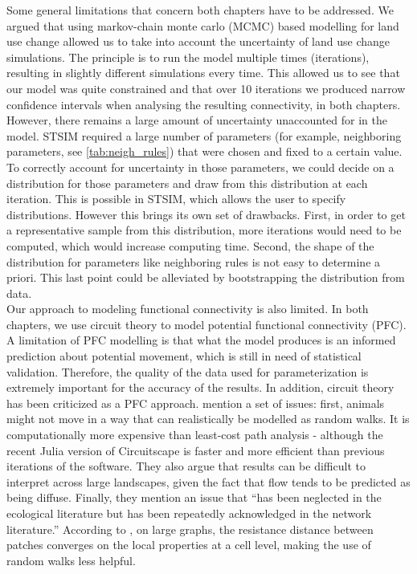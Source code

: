 \documentclass[12pt,Bold,TexShade]{thesis/mcgilletdclass}
\begin{document}
{Some general limitations that concern both chapters have to be addressed. We argued that using markov-chain monte carlo (MCMC) based modelling for land use change allowed us to take into account the uncertainty of land use change simulations. The principle is to run the model multiple times (iterations), resulting in slightly different simulations every time. This allowed us to see that our model was quite constrained and that over 10 iterations we produced narrow confidence intervals when analysing the resulting connectivity, in both chapters. However, there remains a large amount of uncertainty unaccounted for in the model. STSIM required a large number of parameters (for example, neighboring parameters, see \ref{tab:neigh_rules}) that were chosen and fixed to a certain value. To correctly account for uncertainty in those parameters, we could decide on a distribution for those parameters and draw from this distribution at each iteration. This is possible in STSIM, which allows the user to specify distributions. However this brings its own set of drawbacks. First, in order to get a representative sample from this distribution, more iterations would need to be computed, which would increase computing time. Second, the shape of the distribution for parameters like neighboring rules is not easy to determine a priori. This last point could be alleviated by bootstrapping the distribution from data. \\

Our approach to modeling functional connectivity is also limited. In both chapters, we use circuit theory to model potential functional connectivity (PFC). A limitation of PFC modelling is that what the model produces is an informed prediction about potential movement, which is still in need of statistical validation. Therefore, the quality of the data used for parameterization is extremely important for the accuracy of the results. In addition, circuit theory has been criticized as a PFC approach. \cite{fletcher_spatial_2018} mention a set of issues: first, animals might not move in a way that can realistically be modelled as random walks. It is computationally more expensive than least-cost path analysis - although the recent Julia version of Circuitscape is faster and more efficient than previous iterations of the software. They also argue that results can be difficult to interpret across large landscapes, given the fact that flow tends to be predicted as being diffuse. Finally, they mention an issue that “has been neglected in the ecological literature but has been repeatedly acknowledged in the network literature.” According to \cite{luxburg_hitting_2014}, on large graphs, the resistance distance  between patches converges on the local properties at a cell level, making the use of random walks less helpful. \\

}
\end{document}
